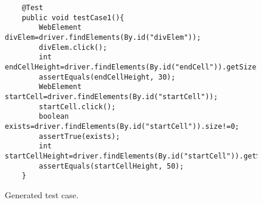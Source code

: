 \begin{figure}
\begin{lstlisting}
	@Test
	public void testCase1(){
		WebElement divElem=driver.findElements(By.id("divElem"));
		divElem.click();
		int endCellHeight=driver.findElements(By.id("endCell")).getSize().height;
		assertEquals(endCellHeight, 30);
		WebElement startCell=driver.findElements(By.id("startCell"));
		startCell.click();
		boolean exists=driver.findElements(By.id("startCell")).size!=0;
		assertTrue(exists);
		int startCellHeight=driver.findElements(By.id("startCell")).getSize().height;
		assertEquals(startCellHeight, 50);
	}
\end{lstlisting}
\vspace{-0.1in} 

\caption{Generated \selenium test case.}
\label{Fig:domTestSample}
\vspace{-0.2in} 
\end{figure}